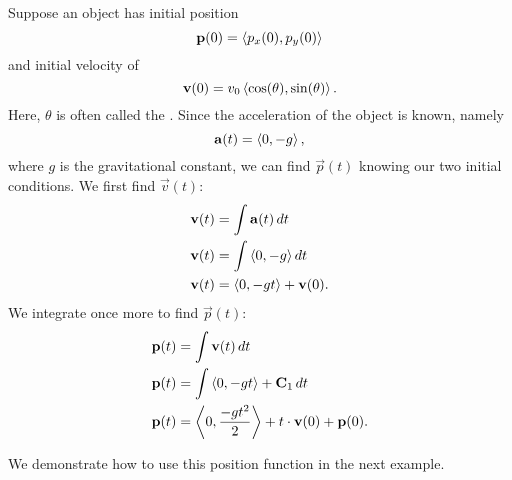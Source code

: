 \documentclass{ximera}
\begin{document}
Suppose an object has initial position
\[
\mathbf{p}(0) = \left\langle p_x(0),p_y(0)\right\rangle
\]
and initial velocity of
\[
\mathbf{v}(0) = v_0\left\langle \cos(\theta),\sin(\theta)\right\rangle.
\]
Here, $\theta$ is often called the .  Since
the acceleration of the object is known, namely
\[
\mathbf{a}(t) =\left\langle 0,-g\right\rangle,
\]
where $g$ is the gravitational constant, we can find $\vec{p}(t)$ knowing
our two initial conditions. We first find $\vec{v}(t)$:
\begin{align*}
  \mathbf{v}(t) &= \int \mathbf{a}(t) \mathop{}\!d t\\
  \mathbf{v}(t) &= \int \left\langle 0,-g\right\rangle \mathop{}\!d t\\
  \mathbf{v}(t) &= \left\langle 0,-gt\right\rangle + \mathbf{v}(0).
\end{align*}
We integrate once more to find $\vec{p}(t)$:
\begin{align*}
\mathbf{p}(t) &= \int \mathbf{v}(t)\mathop{}\!d t \\
\mathbf{p}(t) &= \int \left\langle 0,-gt\right\rangle + \mathbf C_1 \mathop{}\!d t\\
\mathbf{p}(t) &= \left\langle 0, \frac{-gt^2}{2}\right\rangle +t\cdot \mathbf{v}(0)+ \mathbf{p}(0).
\end{align*}

We demonstrate how to use this position function in the next
example.
\end{document}
